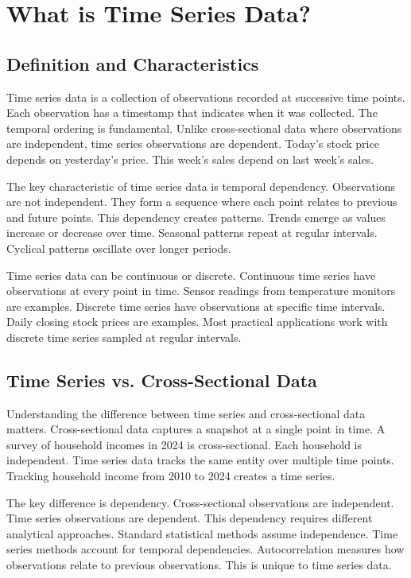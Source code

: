 \section{What is Time Series Data?}

\subsection{Definition and Characteristics}

Time series data is a collection of observations recorded at successive time points. Each observation has a timestamp that indicates when it was collected. The temporal ordering is fundamental. Unlike cross-sectional data where observations are independent, time series observations are dependent. Today's stock price depends on yesterday's price. This week's sales depend on last week's sales.

The key characteristic of time series data is temporal dependency. Observations are not independent. They form a sequence where each point relates to previous and future points. This dependency creates patterns. Trends emerge as values increase or decrease over time. Seasonal patterns repeat at regular intervals. Cyclical patterns oscillate over longer periods.

Time series data can be continuous or discrete. Continuous time series have observations at every point in time. Sensor readings from temperature monitors are examples. Discrete time series have observations at specific time intervals. Daily closing stock prices are examples. Most practical applications work with discrete time series sampled at regular intervals.

\subsection{Time Series vs. Cross-Sectional Data}

Understanding the difference between time series and cross-sectional data matters. Cross-sectional data captures a snapshot at a single point in time. A survey of household incomes in 2024 is cross-sectional. Each household is independent. Time series data tracks the same entity over multiple time points. Tracking household income from 2010 to 2024 creates a time series.

The key difference is dependency. Cross-sectional observations are independent. Time series observations are dependent. This dependency requires different analytical approaches. Standard statistical methods assume independence. Time series methods account for temporal dependencies. Autocorrelation measures how observations relate to previous observations. This is unique to time series data.


